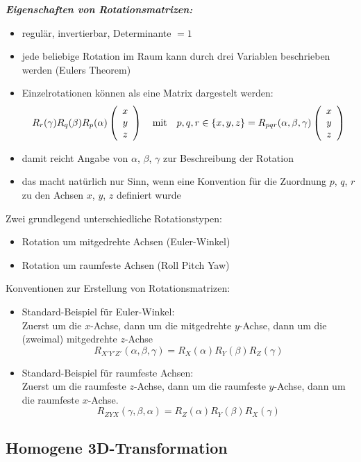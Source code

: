 \textbf{\textsl{Eigenschaften von Rotationsmatrizen:}}
\begin{itemize}
\item regulär, invertierbar, Determinante $=1$
\item jede beliebige Rotation im Raum kann durch drei Variablen beschrieben werden (Eulers Theorem)
\item Einzelrotationen können als eine Matrix dargestelt werden: $$R_r(\gamma) R_q(\beta) R_p(\alpha) \left( \begin{array}{c} x \\ y \\ z \end{array} \right) \quad \textrm{mit} \quad p,q,r \in \{x,y,z\} = R_{pqr}(\alpha, \beta, \gamma) \left( \begin{array}{c} x \\ y \\ z \end{array} \right)$$
\item damit reicht Angabe von $\alpha$, $\beta$, $\gamma$ zur Beschreibung der Rotation
\item das macht natürlich nur Sinn, wenn eine Konvention für die Zuordnung $p$, $q$, $r$ zu den Achsen $x$, $y$, $z$ definiert wurde
\end{itemize}
Zwei grundlegend unterschiedliche Rotationstypen:
\begin{itemize}
\item Rotation um mitgedrehte Achsen (Euler-Winkel)
\item Rotation um raumfeste Achsen (Roll Pitch Yaw)
\end{itemize}
Konventionen zur Erstellung von Rotationsmatrizen:
\begin{itemize}
\item Standard-Beispiel für Euler-Winkel: \\ Zuerst um die $x$-Achse, dann um die mitgedrehte $y$-Achse, dann um die (zweimal) mitgedrehte $z$-Achse $$R_{X'Y'Z'}(\alpha , \beta , \gamma) = R_X(\alpha) R_Y(\beta) R_Z(\gamma)$$
\item Standard-Beispiel für raumfeste Achsen: \\ Zuerst um die raumfeste $z$-Achse, dann um die raumfeste $y$-Achse, dann um die raumfeste $x$-Achse. $$R_{ZYX}(\gamma, \beta, \alpha)= R_Z(\alpha) R_Y(\beta) R_X(\gamma)$$
\end{itemize}

\subsection{Homogene 3D-Transformation}

